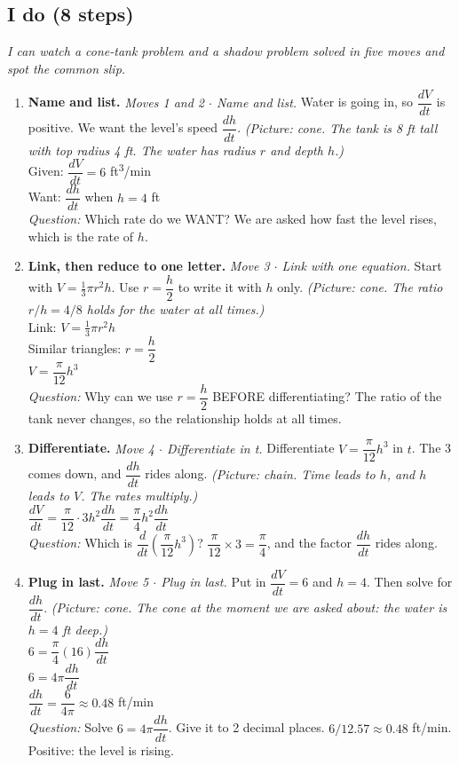 \documentclass[11pt]{article}
\begin{document}
\subsection*{I do (8 steps)}
\textit{I can watch a cone-tank problem and a shadow problem solved in five moves and spot the common slip.}\par
\begin{enumerate}
\item \textbf{Name and list.} \textit{Moves 1 and 2 $\cdot$ Name and list.} Water is going in, so $\dfrac{dV}{dt}$ is positive. We want the level's speed $\dfrac{dh}{dt}$. \textit{(Picture: cone. The tank is 8 ft tall with top radius 4 ft. The water has radius $r$ and depth $h$.)}\\ Given: $\dfrac{dV}{dt}=6$ ft\textsuperscript{3}/min\\ Want: $\dfrac{dh}{dt}$ when $h=4$ ft\\ \textit{Question:} Which rate do we WANT?  We are asked how fast the level rises, which is the rate of $h$.
\item \textbf{Link, then reduce to one letter.} \textit{Move 3 $\cdot$ Link with one equation.} Start with $V=\tfrac13\pi r^2h$. Use $r=\dfrac h2$ to write it with $h$ only. \textit{(Picture: cone. The ratio $r/h=4/8$ holds for the water at all times.)}\\ Link: $V=\tfrac13\pi r^2h$\\ Similar triangles: $r=\dfrac h2$\\ $V=\dfrac{\pi}{12}h^3$\\ \textit{Question:} Why can we use $r=\dfrac h2$ BEFORE differentiating?  The ratio of the tank never changes, so the relationship holds at all times.
\item \textbf{Differentiate.} \textit{Move 4 $\cdot$ Differentiate in t.} Differentiate $V=\dfrac{\pi}{12}h^3$ in $t$. The 3 comes down, and $\dfrac{dh}{dt}$ rides along. \textit{(Picture: chain. Time leads to $h$, and $h$ leads to $V$. The rates multiply.)}\\ $\dfrac{dV}{dt}=\dfrac{\pi}{12}\cdot3h^2\dfrac{dh}{dt}=\dfrac{\pi}{4}h^2\dfrac{dh}{dt}$\\ \textit{Question:} Which is $\dfrac{d}{dt}\left(\dfrac{\pi}{12}h^3\right)$?  $\dfrac{\pi}{12}\times3=\dfrac{\pi}{4}$, and the factor $\dfrac{dh}{dt}$ rides along.
\item \textbf{Plug in last.} \textit{Move 5 $\cdot$ Plug in last.} Put in $\dfrac{dV}{dt}=6$ and $h=4$. Then solve for $\dfrac{dh}{dt}$. \textit{(Picture: cone. The cone at the moment we are asked about: the water is $h=4$ ft deep.)}\\ $6=\dfrac{\pi}{4}(16)\dfrac{dh}{dt}$\\ $6=4\pi\dfrac{dh}{dt}$\\ $\dfrac{dh}{dt}=\dfrac{6}{4\pi}\approx0.48$ ft/min\\ \textit{Question:} Solve $6=4\pi\dfrac{dh}{dt}$. Give it to 2 decimal places.  $6/12.57\approx0.48$ ft/min. Positive: the level is rising.

\end{enumerate}
\end{document}
